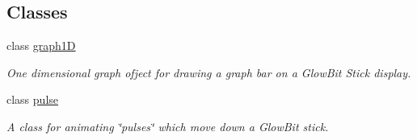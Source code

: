 \subsection*{Classes}
\begin{DoxyCompactItemize}
\item 
class \hyperlink{classglowbit_1_1stick_1_1graph1D}{graph1D}
\begin{DoxyCompactList}\small\item\em One dimensional graph ofject for drawing a graph bar on a Glow\+Bit Stick display. \end{DoxyCompactList}\item 
class \hyperlink{classglowbit_1_1stick_1_1pulse}{pulse}
\begin{DoxyCompactList}\small\item\em A class for animating \char`\"{}pulses\char`\"{} which move down a Glow\+Bit stick. \end{DoxyCompactList}\end{DoxyCompactItemize}
